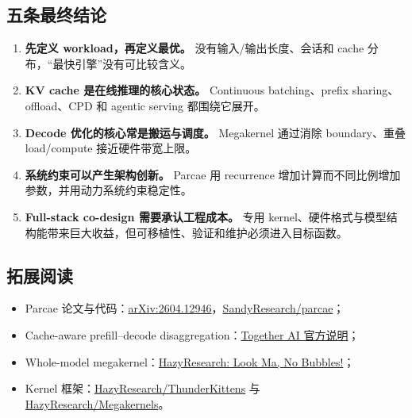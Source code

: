 \subsection{五条最终结论}

\begin{enumerate}
  \item \textbf{先定义 workload，再定义最优。} 没有输入/输出长度、会话和 cache 分布，“最快引擎”没有可比较含义。
  \item \textbf{KV cache 是在线推理的核心状态。} Continuous batching、prefix sharing、offload、CPD 和 agentic serving 都围绕它展开。
  \item \textbf{Decode 优化的核心常是搬运与调度。} Megakernel 通过消除 boundary、重叠 load/compute 接近硬件带宽上限。
  \item \textbf{系统约束可以产生架构创新。} Parcae 用 recurrence 增加计算而不同比例增加参数，并用动力系统约束稳定性。
  \item \textbf{Full-stack co-design 需要承认工程成本。} 专用 kernel、硬件格式与模型结构能带来巨大收益，但可移植性、验证和维护必须进入目标函数。
\end{enumerate}

\enlargethispage{2\baselineskip}
\subsection{拓展阅读}

\begin{itemize}
  \item Parcae 论文与代码：\href{https://arxiv.org/abs/2604.12946}{arXiv:2604.12946}，\href{https://github.com/sandyresearch/parcae}{SandyResearch/parcae}；
  \item Cache-aware prefill--decode disaggregation：\href{https://www.together.ai/blog/cache-aware-disaggregated-inference}{Together AI 官方说明}；
  \item Whole-model megakernel：\href{https://hazyresearch.stanford.edu/blog/2025-05-27-no-bubbles}{HazyResearch: Look Ma, No Bubbles!}；
  \item Kernel 框架：\href{https://github.com/HazyResearch/ThunderKittens}{HazyResearch/ThunderKittens} 与 \href{https://github.com/HazyResearch/Megakernels}{HazyResearch/Megakernels}。
\end{itemize}


